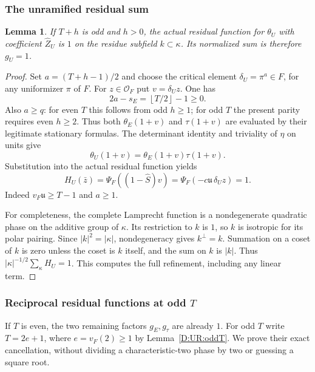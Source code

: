 \documentclass[11pt]{amsart}
\newtheorem{lemma}[theorem]{Lemma}
\theoremstyle{definition}
\theoremstyle{remark}
\newcommand{\floor}[1]{\left\lfloor #1\right\rfloor}
\newcommand{\OO}{\mathcal O}\newcommand{\pp}{\mathfrak p}\newcommand{\PP}{\mathfrak P}
\begin{document}
\subsubsection*{The unramified residual sum}
\begin{lemma}\label{D:UR:resU}
If $T+h$ is odd and $h>0$, the actual residual function for
$\theta_U$ with coefficient $\widehat Z_U$ is $1$ on the residue subfield
$k\subset\kappa$. Its normalized sum is therefore $g_U=1$.
\end{lemma}
\begin{proof}
Set $a=(T+h-1)/2$ and choose the critical element
$\delta_U=\pi^a\in F$, for any uniformizer $\pi$ of $F$.
For $z\in\OO_F$ put $v=\delta_Uz$. One has
\[
 2a-s_E=\floor{T/2}-1\ge0.
\]
Also $a\ge q$: for even $T$ this follows from odd $h\ge1$; for odd $T$
the present parity requires even $h\ge2$. Thus both $\theta_E(1+v)$ and
$\tau(1+v)$ are evaluated by their legitimate stationary formulas.
The determinant identity and triviality of $\eta$ on units give
\[
 \theta_U(1+v)=\theta_E(1+v)\tau(1+v).
\]
Substitution into the actual residual function yields
\[
 H_U(\bar z)=\Psi_F((1-\widehat S)v)
            =\Psi_F(-c\mathfrak u\,\delta_Uz)=1.
\]
Indeed $v_F\mathfrak u\ge T-1$ and $a\ge1$.

For completeness, the complete Lamprecht function is a nondegenerate
quadratic phase on the additive group of $\kappa$. Its restriction to $k$
is $1$, so $k$ is isotropic for its polar pairing. Since $|k|^2=|\kappa|$,
nondegeneracy gives $k^\perp=k$. Summation on a coset of $k$ is zero unless
the coset is $k$ itself, and the sum on $k$ is $|k|$. Thus
$|\kappa|^{-1/2}\sum_\kappa H_U=1$. This computes the full refinement,
including any linear term.
\end{proof}

\subsubsection*{Reciprocal residual functions at odd \texorpdfstring{$T$}{T}}
If $T$ is even, the two remaining factors $g_E,g_\tau$ are already $1$.
For odd $T$ write $T=2e+1$, where $e=v_F(2)\ge1$ by Lemma~\ref{D:UR:oddT}.
We prove their exact cancellation, without dividing a characteristic-two
phase by two or guessing a square root.
\end{document}
